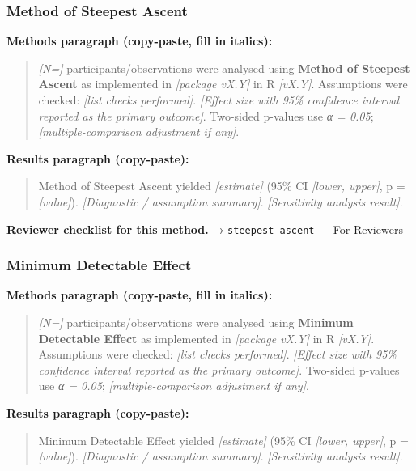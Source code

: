 \documentclass[
]{article}
\begin{document}
\subsubsection{Method of Steepest
Ascent}\label{method-of-steepest-ascent}

\textbf{Methods paragraph (copy-paste, fill in italics):}

\begin{quote}
\emph{{[}N={]}} participants/observations were analysed using
\textbf{Method of Steepest Ascent} as implemented in \emph{{[}package
vX.Y{]}} in R \emph{{[}vX.Y{]}}. Assumptions were checked: \emph{{[}list
checks performed{]}}. \emph{{[}Effect size with 95\% confidence interval
reported as the primary outcome{]}}. Two-sided p-values use \emph{α =
0.05}; \emph{{[}multiple-comparison adjustment if any{]}}.
\end{quote}

\textbf{Results paragraph (copy-paste):}

\begin{quote}
Method of Steepest Ascent yielded \emph{{[}estimate{]}} (95\% CI
\emph{{[}lower, upper{]}}, p = \emph{{[}value{]}}). \emph{{[}Diagnostic
/ assumption summary{]}}. \emph{{[}Sensitivity analysis result{]}}.
\end{quote}

\textbf{Reviewer checklist for this method.} →
\href{../chapters/16-design/steepest-ascent.Rmd\#for-reviewers}{\texttt{steepest-ascent}
--- For Reviewers}

\subsubsection{Minimum Detectable
Effect}\label{minimum-detectable-effect}

\textbf{Methods paragraph (copy-paste, fill in italics):}

\begin{quote}
\emph{{[}N={]}} participants/observations were analysed using
\textbf{Minimum Detectable Effect} as implemented in \emph{{[}package
vX.Y{]}} in R \emph{{[}vX.Y{]}}. Assumptions were checked: \emph{{[}list
checks performed{]}}. \emph{{[}Effect size with 95\% confidence interval
reported as the primary outcome{]}}. Two-sided p-values use \emph{α =
0.05}; \emph{{[}multiple-comparison adjustment if any{]}}.
\end{quote}

\textbf{Results paragraph (copy-paste):}

\begin{quote}
Minimum Detectable Effect yielded \emph{{[}estimate{]}} (95\% CI
\emph{{[}lower, upper{]}}, p = \emph{{[}value{]}}). \emph{{[}Diagnostic
/ assumption summary{]}}. \emph{{[}Sensitivity analysis result{]}}.
\end{quote}
\end{document}
